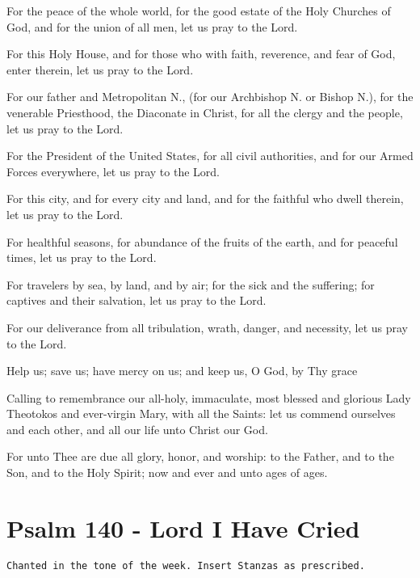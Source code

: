 \documentclass[twoside, letterpaper, 12pt]{report}
\newcommand{\instruction}[1]{%
  \texttt{\scriptsize{#1}}%
}
\newcommand{\centeredsection}[1]{%
  \section*{\centering{}#1}%
}
\begin{document}
\begin{deacon}
\item For the peace of the whole world, for the good estate of the Holy Churches of God,
    and for the union of all men, let us pray to the Lord.
\item For this Holy House, and for those who with faith, reverence, and fear of God,
    enter therein, let us pray to the Lord.
\item For our father and Metropolitan N., (for our Archbishop N. or Bishop N.),
    for the venerable Priesthood, the Diaconate in Christ,
    for all the clergy and the people, let us pray to the Lord.
\item  For the President of the United States, for all civil authorities,
    and for our Armed Forces everywhere, let us pray to the Lord.
\item For this city, and for every city and land, and for the faithful who dwell
    therein, let us pray to the Lord.
\item For healthful seasons, for abundance of the fruits of the earth,
    and for peaceful times, let us pray to the Lord.
\item For travelers by sea, by land, and by air; for the sick and the suffering;
    for captives and their salvation, let us pray to the Lord.
\item For our deliverance from all tribulation, wrath, danger, and necessity,
    let us pray to the Lord.
\item  Help us; save us; have mercy on us; and keep us, O God, by Thy grace
\item Calling to remembrance our all-holy, immaculate, most blessed and glorious Lady
    Theotokos and ever-virgin Mary, with all the Saints: let us commend ourselves and
    each other, and all our life unto Christ our God.
\end{deacon}


\begin{priest}
\item For unto Thee are due all glory, honor, and worship: to the Father,
    and to the Son, and to the Holy Spirit; now and ever and unto ages of ages.
\end{priest}


\centeredsection{Psalm 140 - Lord I Have Cried}
\instruction{Chanted in the tone of the week. Insert Stanzas as prescribed.}
\end{document}

